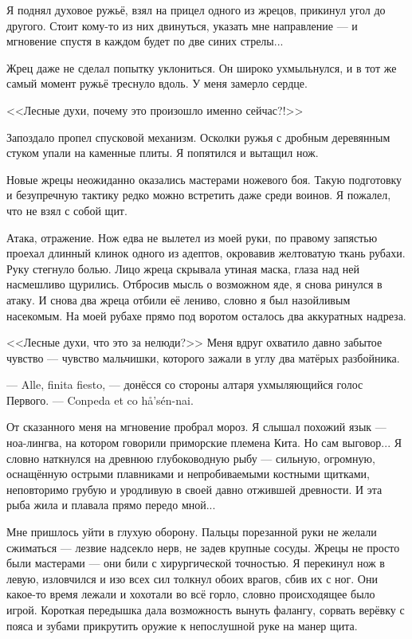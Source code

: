 Я поднял духовое ружьё, взял на прицел одного из жрецов, прикинул угол до другого.
Стоит кому-то из них двинуться, указать мне направление --- и мгновение спустя в каждом будет по две синих стрелы...

Жрец даже не сделал попытку уклониться.
Он широко ухмыльнулся, и в тот же самый момент ружьё треснуло вдоль.
У меня замерло сердце.

<<Лесные духи, почему это произошло именно сейчас?!>>

Запоздало пропел спусковой механизм.
Осколки ружья с дробным деревянным стуком упали на каменные плиты.
Я попятился и вытащил нож.

Новые жрецы неожиданно оказались мастерами ножевого боя.
Такую подготовку и безупречную тактику редко можно встретить даже среди воинов.
Я пожалел, что не взял с собой щит.

Атака, отражение.
Нож едва не вылетел из моей руки, по правому запястью проехал длинный клинок одного из адептов, окровавив желтоватую ткань рубахи.
Руку стегнуло болью.
Лицо жреца скрывала утиная маска, глаза над ней насмешливо щурились.
Отбросив мысль о возможном яде, я снова ринулся в атаку.
И снова два жреца отбили её лениво, словно я был назойливым насекомым.
На моей рубахе прямо под воротом осталось два аккуратных надреза.

<<Лесные духи, что это за нелюди?>>
Меня вдруг охватило давно забытое чувство --- чувство мальчишки, которого зажали в углу два матёрых разбойника.

--- Alle, finita fiesto\FM, --- донёсся со стороны алтаря ухмыляющийся голос Первого.
--- Conpeda et co h\r{a}'s\'{e}n-nai\FM.

От сказанного меня на мгновение пробрал мороз.
Я слышал похожий язык --- ноа-лингва, на котором говорили приморские племена Кита.
Но сам выговор...
Я словно наткнулся на древнюю глубоководную рыбу --- сильную, огромную, оснащённую острыми плавниками и непробиваемыми костными щитками, неповторимо грубую и уродливую в своей давно отжившей древности.
И эта рыба жила и плавала прямо передо мной...

Мне пришлось уйти в глухую оборону.
Пальцы порезанной руки не желали сжиматься --- лезвие надсекло нерв, не задев крупные сосуды.
Жрецы не просто были мастерами --- они били с хирургической точностью.
Я перекинул нож в левую, изловчился и изо всех сил толкнул обоих врагов, сбив их с ног.
Они какое-то время лежали и хохотали во всё горло, словно происходящее было игрой.
Короткая передышка дала возможность вынуть фалангу, сорвать верёвку с пояса и зубами прикрутить оружие к непослушной руке на манер щита.

